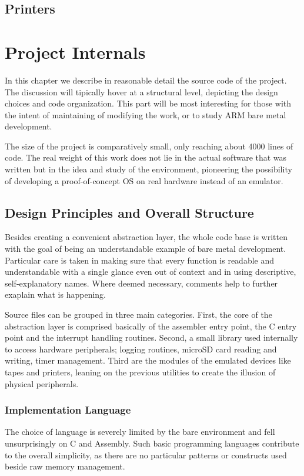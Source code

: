 \documentclass[12pt,a4paper,openright,twoside]{report}
\begin{document}
\section{Printers}



\clearpage{\pagestyle{empty}\cleardoublepage}
\chapter{Project Internals}
In this chapter we describe in reasonable detail the source code of the 
project. The discussion will tipically hover at a structural level, depicting 
the design choices and code organization. This part will be most interesting for
those with the intent of maintaining of modifying the work, or to study ARM
bare metal development.

The size of the project is comparatively small, only reaching about 4000 lines of 
code. The real weight of this work does not lie in the actual software that was
written but in the idea and study of the environment, pioneering the possibility
of developing a proof-of-concept OS on real hardware instead of an emulator.

\section{Design Principles and Overall Structure}
Besides creating a convenient abstraction layer, the whole code base is written 
with the goal of being an understandable example of bare metal development. Particular 
care is taken in making sure that every function is readable and understandable
with a single glance even out of context and in using descriptive, self-explanatory
names. Where deemed necessary, comments help to further exaplain what is happening.

Source files can be grouped in three main categories. First, the core of the abstraction
layer is comprised basically of the assembler entry point, the C entry point and
the interrupt handling routines. Second, a small library used internally to 
access hardware peripherals; logging routines, microSD card reading and writing, 
timer management. Third are the modules of the emulated devices like tapes and
printers, leaning on the previous utilities to create the illusion of physical
peripherals.

\subsection{Implementation Language}
The choice of language is severely limited by the bare environment and fell unsurprisingly
on C and Assembly. Such basic programming languages contribute to the overall simplicity,
as there are no particular patterns or constructs used beside raw memory management.
\end{document}
